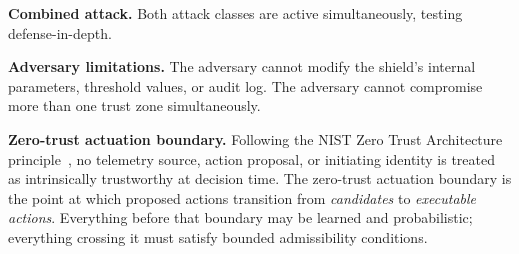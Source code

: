\documentclass[10pt,journal,compsoc]{IEEEtran}
\begin{document}
\noindent\textbf{Combined attack.}
Both attack classes are active simultaneously, testing defense-in-depth.

\noindent\textbf{Adversary limitations.}
The adversary cannot modify the shield's internal parameters, threshold values, or audit log.
The adversary cannot compromise more than one trust zone simultaneously.

\noindent\textbf{Zero-trust actuation boundary.}
Following the NIST Zero Trust Architecture principle~\cite{rose2020nist}, no telemetry source, action proposal, or initiating identity is treated as intrinsically trustworthy at decision time.
The zero-trust actuation boundary is the point at which proposed actions transition from \emph{candidates} to \emph{executable actions}.
Everything before that boundary may be learned and probabilistic; everything crossing it must satisfy bounded admissibility conditions.
\end{document}
